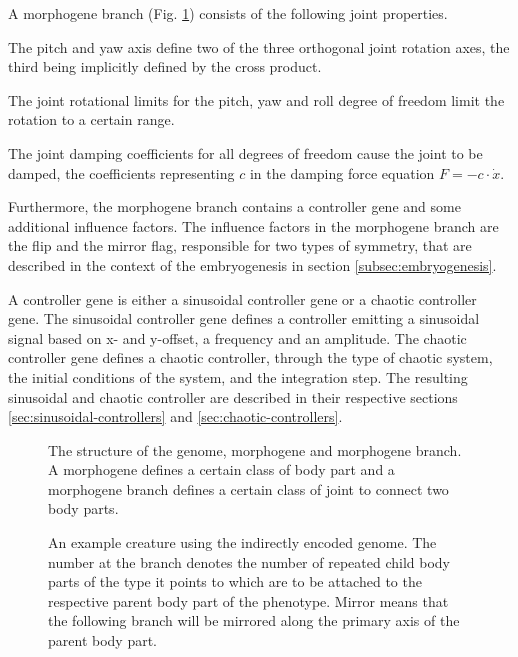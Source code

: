 \documentclass[main]{subfiles}
\begin{document}
A morphogene branch (Fig. \ref{figure:genome-structure}) consists of the following joint properties. %

The pitch and yaw axis define two of the three orthogonal joint rotation axes, the third being implicitly defined by the cross product. %

The joint rotational limits for the pitch, yaw and roll degree of freedom limit the rotation to a certain range. %

The joint damping coefficients for all degrees of freedom cause the joint to be damped, the coefficients representing \(c\) in the damping force equation \(F = -c \cdot \dot x\). %

Furthermore, the morphogene branch contains a controller gene and some additional influence factors. %
%
The influence factors in the morphogene branch are the flip and the mirror flag, responsible for two types of symmetry, that are described in the context of the embryogenesis in section \ref{subsec:embryogenesis}.

A controller gene is either a sinusoidal controller gene or a chaotic controller gene. %
%
The sinusoidal controller gene defines a controller emitting a sinusoidal signal based on x- and y-offset, a frequency and an amplitude. %
%
The chaotic controller gene defines a chaotic controller, through the type of chaotic system, the initial conditions of the system, and the integration step. %
%
The resulting sinusoidal and chaotic controller are described in their respective sections \ref{sec:sinusoidal-controllers} and \ref{sec:chaotic-controllers}.

\begin{figure}[H]
\hspace*{-0.2in}


\caption[Indirectly encoded genome structure]{The structure of the genome, morphogene and morphogene branch. A morphogene defines a certain class of body part and a morphogene branch defines a certain class of joint to connect two body parts.}
\label{figure:genome-structure}
\end{figure}

\begin{figure}[H]
\center


\caption[Example creature using an indirectly encoded genome]{An example creature using the indirectly encoded genome. The number at the branch denotes the number of repeated child body parts of the type it points to which are to be attached to the respective parent body part of the phenotype. Mirror means that the following branch will be mirrored along the primary axis of the parent body part.}
\label{figure:indirect-genotype}
\end{figure}
\end{document}
